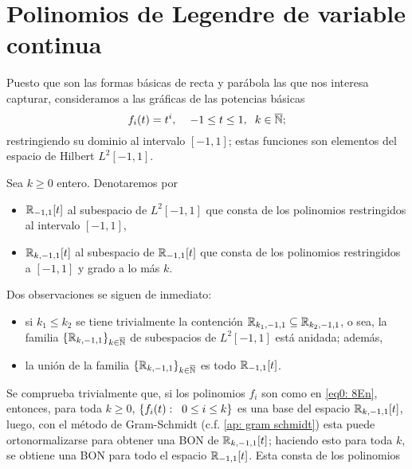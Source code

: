 \section{Polinomios de Legendre de variable continua}
Puesto que son las
formas básicas de recta y parábola las que nos interesa
capturar,
consideramos a las gráficas de las potencias básicas
\begin{equation}
\label{eq0: 8En}
f_{i}(t)= t^{i}, \hspace{0.4cm}
-1 \leq t \leq 1, \hspace{0.2cm}
 k \in \overline{\mathbb{N}};
\end{equation}
restringiendo su dominio al intervalo $[-1,1]$;
estas funciones son 
elementos del 
espacio de Hilbert $L^{2}[-1,1]$. 


\begin{notacion}
\label{notacion: 17ap}
Sea $k \geq 0$ entero.
Denotaremos por 
\begin{itemize}
	\item $\mathbb{R}_{-1,1}[t]$ al subespacio de $L^{2}[-1,1]$ que consta de los
	polinomios restringidos al intervalo $[-1,1]$,
	
	\item $\mathbb{R}_{k,-1,1}[t]$ al subespacio de $\mathbb{R}_{-1,1}[t]$
	que consta de los polinomios restringidos a $[-1,1]$ y grado a lo
	más $k$.
\end{itemize}
\end{notacion}


Dos observaciones se siguen de inmediato:
\begin{itemize}
	\item si $k_{1} \leq k_{2}$ se tiene trivialmente la contención
$\mathbb{R}_{k_{1}, -1,1} \subseteq \mathbb{R}_{k_{2}, -1,1}$, o sea, la familia
$\{\mathbb{R}_{k, -1,1}\}_{k \in \overline{\mathbb{N}}}$ de subespacios
de $L^{2}[-1,1]$ está anidada; además, 

	\item la unión de la familia $\{\mathbb{R}_{k, -1,1}\}_{k \in \overline{\mathbb{N}}}$
	es todo $\mathbb{R}_{-1,1}[t]$.
\end{itemize}


Se comprueba trivialmente que, si los polinomios
$f_{i}$ son como en \eqref{eq0: 8En}, entonces,
para toda $k \geq 0$, $\{f_{i}(t): \hspace{0.2cm} 0 \leq i \leq k \}$
es una base del espacio $\mathbb{R}_{k,-1,1}[t]$, luego, con el 
método de Gram-Schmidt
(c.f. \ref{ap: gram schmidt}) esta puede ortonormalizarse para
obtener una BON de $\mathbb{R}_{k,-1,1}[t]$; haciendo esto
para toda $k$, se obtiene una BON 
para todo el espacio $\mathbb{R}_{-1,1}[t]$. Esta consta de los polinomios


